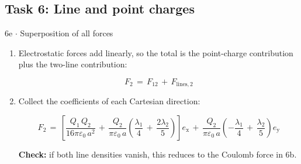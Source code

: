 \documentclass[11pt]{article}
\begin{document}
\begin{keepsection}\subsection{Task 6: Line and point charges}

\begin{workedbox}{6e \ensuremath{\cdot} Superposition of all forces}
\begin{enumerate}
\item {}
Electrostatic forces add linearly, so the total is the point-charge contribution plus the two-line contribution:

\begin{equation*}{F}_{2}\, =\, {F}_{12}\, +\, {F}_{\text{lines},2}\end{equation*}
\item {}
Collect the coefficients of each Cartesian direction:

\begin{equation*}{F}_{2}\, =\, \left[\dfrac{{Q}_{1}\, {Q}_{2}}{16πε_{0}\, {a}^{2}}\, +\, \dfrac{{Q}_{2}}{πε_{0}\, {a}}\left(\dfrac{λ_{1}}{4}\, +\, \dfrac{2λ_{2}}{5}\right)\right]{e}_{\mathrm{x}}\, +\, \dfrac{{Q}_{2}}{πε_{0}\, {a}}\left(-\dfrac{λ_{1}}{4}\, +\, \dfrac{λ_{2}}{5}\right){e}_{\mathrm{y}}\end{equation*}

\textbf{Check:} if both line densities vanish, this reduces to the Coulomb force in 6b.
\end{enumerate}
\end{workedbox}

\end{keepsection}
\end{document}
